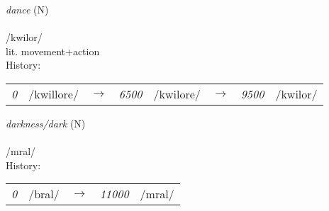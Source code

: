 \vspace{15pt}
\begin{nopagebreak}
 \textit{dance} (N)\\
\\
\noindent /kw{\textprimstress}ilor/\\
\noindent lit. movement+action\\


\noindent History:

\vspace{-0pt}
\hspace{40pt}
\begin{tabular}{ccc}
\textit{0} & /kwillore/&$\rightarrow$ & \textit{6500} & /kwilore/&$\rightarrow$ & \textit{9500} & /kwilor/& \\
\end{tabular}

\vspace{20pt}\hline

\end{nopagebreak}
\filbreak



\vspace{15pt}
\begin{nopagebreak}
 \textit{darkness/dark} (N)\\
\\
\noindent /mr{\textprimstress}al/\\


\noindent History:

\vspace{-0pt}
\hspace{40pt}
\begin{tabular}{ccc}
\textit{0} & /bral/&$\rightarrow$ & \textit{11000} & /mral/& \\
\end{tabular}

\vspace{20pt}\hline

\end{nopagebreak}
\filbreak



